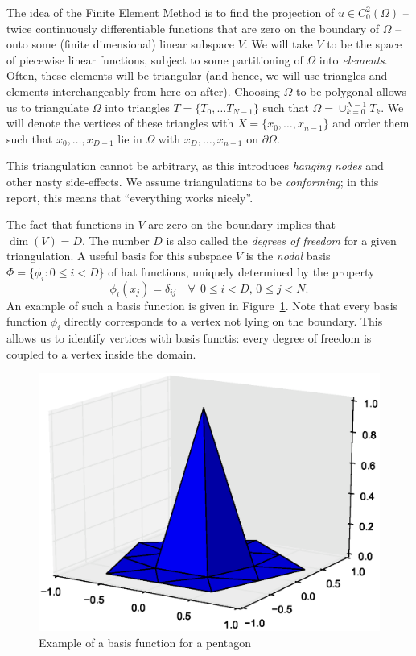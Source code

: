 \documentclass[11pt]{amsart}
\theoremstyle{definition}
\begin{document}
The idea of the Finite Element Method is to find the projection of $u \in C^2_0(\Omega)$ -- twice continuously differentiable functions that are zero on the boundary of $\Omega$ -- onto some (finite dimensional) linear subspace $V$. We will take $V$ to be the space of piecewise linear functions, subject to some partitioning of $\Omega$ into \emph{elements}. Often, these elements will be triangular (and hence, we will use triangles and elements interchangeably from here on after). Choosing $\Omega$ to be polygonal allows us to triangulate $\Omega$ into triangles $T = \{ T_0, \ldots T_{N-1}\}$ such that $\Omega = \cup_{k = 0}^{N-1}T_k$. We will denote the vertices of these triangles with $X = \{x_0, \ldots, x_{n-1}\}$ and order them such that $x_0, \ldots, x_{D-1}$ lie in $\Omega$ with $x_{D}, \ldots, x_{n-1}$ on $\partial \Omega$.

This triangulation cannot be arbitrary, as this introduces \emph{hanging nodes} and other nasty side-effects. We assume triangulations to be \emph{conforming}; in this report, this means that ``everything works nicely''.

The fact that functions in $V$ are zero on the boundary implies that $\dim(V) = D$. The number $D$ is also called the \emph{degrees of freedom} for a given triangulation. A useful basis for this subspace $V$ is the \emph{nodal} basis $\Phi = \{\phi_i: 0 \leq i < D\}$ of hat functions, uniquely determined by the property
\[
  \phi_i( x_j) = \delta_{ij} \quad \forall~~0 \leq i < D,\, 0 \leq j < N.
\] An example of such a basis function is given in Figure~\ref{fig:nodal}. Note that every basis function $\phi_i$ directly corresponds to a vertex not lying on the boundary. This allows us to identify vertices with basis functis: every degree of freedom is coupled to a vertex inside the domain.
\begin{figure}[h!]
	\centering
	\includegraphics[width=0.5\linewidth]{nodal_vijfhoek.eps}
\caption{Example of a basis function for a pentagon}
\label{fig:nodal}
\end{figure}
\end{document}
